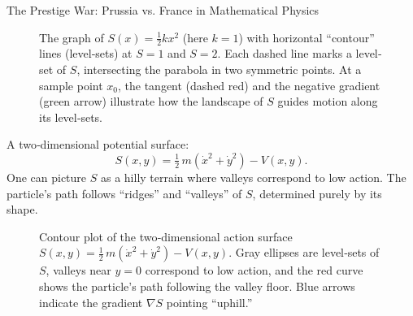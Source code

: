 \begin{HistoricalSidebar}{The Prestige War: Prussia vs. France in Mathematical Physics}
\begin{figure}[H]
    \caption{%
    The graph of $S(x)=\tfrac12kx^2$ (here $k=1$) with horizontal “contour” lines (level‐sets) at $S=1$ and $S=2$.  
    Each dashed line marks a level‐set of $S$, intersecting the parabola in two symmetric points.  
    At a sample point $x_0$, the tangent (dashed red) and the negative gradient (green arrow) illustrate how the landscape of $S$ guides motion along its level‐sets.}
  \end{figure}
    




  A two‐dimensional potential surface:
  \[
    S(x,y) = \tfrac12\,m(\dot x^2 + \dot y^2) - V(x,y).
  \]
  One can picture \(S\) as a hilly terrain where valleys correspond to low action.  The particle’s path follows “ridges” and “valleys” of \(S\), determined purely by its shape.

  \begin{figure}[H]
    \centering
    \caption{Contour plot of the two‐dimensional action surface 
    \(\displaystyle S(x,y)=\tfrac12\,m(\dot x^2+\dot y^2)-V(x,y)\). 
    Gray ellipses are level‐sets of \(S\), valleys near \(y=0\) correspond to low action, and the red curve shows the particle’s path following the valley floor.  Blue arrows indicate the gradient \(\nabla S\) pointing “uphill.”}
  \end{figure}



\end{HistoricalSidebar}
